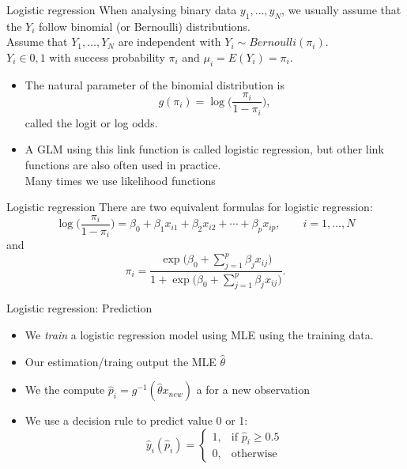 \documentclass[10pt]{beamer}
\begin{document}
\begin{frame}{Logistic regression}
When analysing binary data $y_1,\ldots,y_N$, we usually assume that the $Y_i$ follow binomial (or Bernoulli) distributions.\\[3mm ]\pause
Assume that $Y_1,\ldots,Y_N$ are independent with $Y_i \sim Bernoulli(\pi_i)$.\\[3mm ]\pause
$Y_i \in {0,1}$ with success probability $\pi_i$ and $\mu_i=E(Y_i)=\pi_i$.\\[3mm ]\pause
\begin{itemize}
\item The natural parameter of the binomial distribution is $$g(\pi_i)=\log\Big(\frac{\pi_i}{1-\pi_i}\Big),$$
called the {\color{uured}logit} or {\color{uured}log odds}.\\[3mm ]\pause
\item A GLM using this link function is called {\color{uured}logistic regression}, but other link functions are also often used in practice.\\
Many times we use likelihood functions\\
[3mm]
\end{itemize}
\end{frame}


\begin{frame}{Logistic regression}
There are two equivalent formulas for {\color{uured}logistic regression}:
$$\log\Big(\frac{\pi_i}{1-\pi_i}\Big)=\beta_0+\beta_1 x_{i1}+\beta_2 x_{i2}+\cdots+\beta_p x_{ip},\qquad i=1,\ldots,N$$
and
$$\pi_i=\frac{\exp\Big(\beta_0+\sum_{j=1}^p\beta_jx_{ij}\Big)}{1+\exp\Big(\beta_0+\sum_{j=1}^p\beta_jx_{ij}\Big)}.$$
\end{frame}


\begin{frame}{Logistic regression: Prediction}
\begin{itemize}
\item We \emph{train} a logistic regression model using MLE using the training data.
\item Our estimation/traing output the MLE $\hat{\theta}$
\item We the compute $\hat{p}_i = g^{-1}(\hat{\theta} x_{new})$ a for a new observation
\item We use a {\color{uured} decision rule} to predict value 0 or 1:
\[
    \hat{y}_i(\hat{p}_i)=
\begin{cases}
    1,& \text{if } \hat{p}_i \geq 0.5\\
    0,              & \text{otherwise}
\end{cases}
\]
\end{itemize}
\end{frame}
\end{document}

